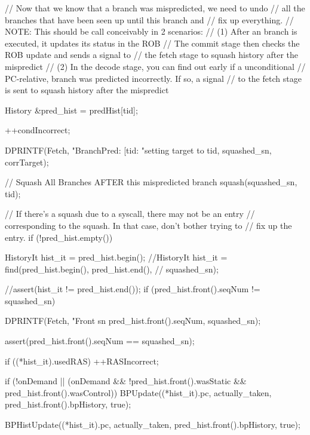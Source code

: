\begin{DoxyCode}
{
    // Now that we know that a branch was mispredicted, we need to undo
    // all the branches that have been seen up until this branch and
    // fix up everything.
    // NOTE: This should be call conceivably in 2 scenarios:
    // (1) After an branch is executed, it updates its status in the ROB
    //     The commit stage then checks the ROB update and sends a signal to
    //     the fetch stage to squash history after the mispredict
    // (2) In the decode stage, you can find out early if a unconditional
    //     PC-relative, branch was predicted incorrectly. If so, a signal
    //     to the fetch stage is sent to squash history after the mispredict

    History &pred_hist = predHist[tid];

    ++condIncorrect;

    DPRINTF(Fetch, "BranchPred: [tid:%
            "setting target to %
            tid, squashed_sn, corrTarget);

    // Squash All Branches AFTER this mispredicted branch
    squash(squashed_sn, tid);

    // If there's a squash due to a syscall, there may not be an entry
    // corresponding to the squash.  In that case, don't bother trying to
    // fix up the entry.
    if (!pred_hist.empty()) {

        HistoryIt hist_it = pred_hist.begin();
        //HistoryIt hist_it = find(pred_hist.begin(), pred_hist.end(),
        //                       squashed_sn);

        //assert(hist_it != pred_hist.end());
        if (pred_hist.front().seqNum != squashed_sn) {
            DPRINTF(Fetch, "Front sn %
                    pred_hist.front().seqNum, squashed_sn);

            assert(pred_hist.front().seqNum == squashed_sn);
        }

        if ((*hist_it).usedRAS) {
            ++RASIncorrect;
        }

                if (!onDemand || 
                    (onDemand && 
                         !pred_hist.front().wasStatic &&
                         pred_hist.front().wasControl)) {
                        BPUpdate((*hist_it).pc, actually_taken,
                                 pred_hist.front().bpHistory, true);
                }

                BPHistUpdate((*hist_it).pc, actually_taken,
                                        pred_hist.front().bpHistory, true);

}}
\end{DoxyCode}
